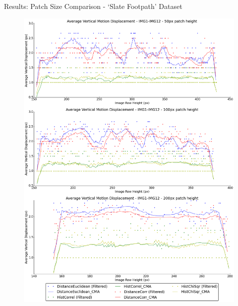 \documentclass[10pt, compress]{beamer}
\begin{document}
\begin{frame}{Results: Patch Size Comparison - `Slate Footpath' Dataset}

\begin{figure}[ht!]
\centering
\vspace{-0.5cm}
\includegraphics[scale=0.145]{path_outside_10cm_scaled.png}
\end{figure}

\end{frame}

\end{document}
